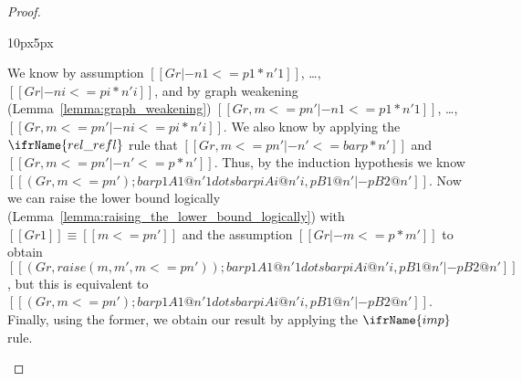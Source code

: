 \begin{proof}
\begin{changemargin}{10px}{5px}
\begin{itemize}
      We know by assumption $[[Gr |- n1 <= p1 * n'1]]$, \ldots, $[[Gr |- ni <= pi * n'i]]$, and by graph weakening 
      (Lemma~\ref{lemma:graph_weakening})
      $[[Gr, m <= p n' |- n1 <= p1 * n'1]]$, \ldots, $[[Gr, m <= p n' |- ni <= pi * n'i]]$.  We also know by
      applying the $\ifrName{\normalsize rel\_refl}$ rule that $[[Gr, m <=p n' |- n' <= bar p * n']]$ and 
      $[[Gr, m <=p n' |- n' <= p * n']]$.  
      Thus, by the induction hypothesis we know 
      $[[(Gr, m <= p n') ; bar p1 A1 @ n'1 dots bar pi Ai @ n'i, p B1 @ n' |- p B2 @ n']]$.
      Now we can raise the lower bound logically (Lemma~\ref{lemma:raising_the_lower_bound_logically}) with 
      $[[Gr1]] \equiv [[m <=p n']]$ and the assumption $[[Gr |- m <=p * m']]$ to obtain \\
      $[[(Gr, raise(m, m', m <= p n')) ; bar p1 A1 @ n'1 dots bar pi Ai @ n'i, p B1 @ n' |- p B2 @ n']]$, but this is
      equivalent to $[[(Gr, m <= p n') ; bar p1 A1 @ n'1 dots bar pi Ai @ n'i, p B1 @ n' |- p B2 @ n']]$.  
      Finally, using the former, we obtain our result by applying the $\ifrName{\normalsize imp}$ rule.



\end{itemize}
\end{changemargin}
\end{proof}
